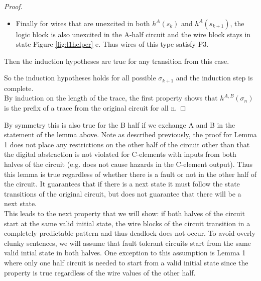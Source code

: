 \documentclass[12pt]{report}
\begin{document}
\begin{proof}
\begin{itemize}
\begin{itemize}
\item
Finally for wires that are unexcited in both $h^A(s_k)$ and $h^A(s_{k+1})$, the logic block is also unexcited in the A-half circuit and the wire block stays in state Figure \ref{fig:l1helper} e.  Thus wires of this type satisfy P3.
\end{itemize}
Then the induction hypotheses are true for any transition from this case. 
\end{itemize}
So the induction hypotheses holds for all possible $\sigma_{k+1}$ and the induction step is complete. \\
By induction on the length of the trace, the first property shows that $h^{A,B}(\sigma_n)$ is the prefix of a trace from the original circuit for all n.


\end{proof}
By symmetry this is also true for the B half if we exchange A and B in the statement of the lemma above.  
Note as described previously, the proof for Lemma 1 does not place any restrictions on the other half of the circuit other than that the digital abstraction is not violated for C-elements with inputs from both halves of the circuit (e.g. does not cause hazards in the C-element output).  Thus this lemma is true regardless of whether there is a fault or not in the other half of the circuit.  It guarantees that if there is a next state it must follow the state transitions of the original circuit, but does not guarantee that there will be a next state.\\  %

This leads to the next property that we will show: if both halves of the circuit start at the same valid initial state, the wire blocks of the circuit transition in a completely predictable pattern and thus deadlock does not occur.
To avoid overly clunky sentences, we will assume that fault tolerant circuits start from the same valid intial state in both halves.  One exception to this assumption is Lemma 1 where only one half circuit is needed to start from a valid initial state since the property is true regardless of the wire values of the other half.
\end{document}
